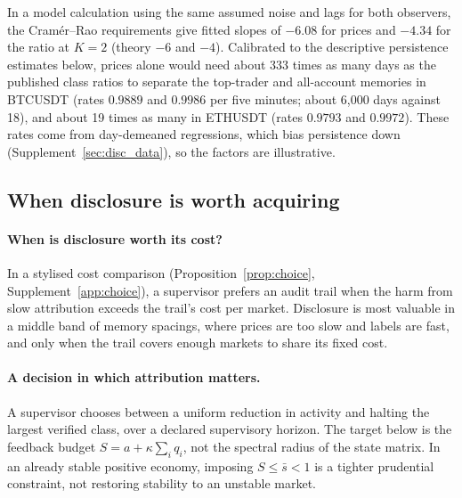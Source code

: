 \documentclass[12pt]{article}
\theoremstyle{definition}
\theoremstyle{remark}
\begin{document}
In a model calculation using the same assumed noise and lags for both observers, the Cram\'er--Rao requirements give fitted slopes of $-6.08$ for prices and $-4.34$ for the ratio at $K=2$ (theory $-6$ and $-4$). Calibrated to the descriptive persistence estimates below, prices alone would need about 333 times as many days as the published class ratios to separate the top-trader and all-account memories in BTCUSDT (rates $0.9889$ and $0.9986$ per five minutes; about 6{,}000 days against 18), and about 19 times as many in ETHUSDT (rates $0.9793$ and $0.9972$). These rates come from day-demeaned regressions, which bias persistence down (Supplement~\ref{sec:disc_data}), so the factors are illustrative.

\subsection{When disclosure is worth acquiring}\label{sec:decision}

\paragraph{When is disclosure worth its cost?} In a stylised cost comparison (Proposition~\ref{prop:choice}, Supplement~\ref{app:choice}), a supervisor prefers an audit trail when the harm from slow attribution exceeds the trail's cost per market. Disclosure is most valuable in a middle band of memory spacings, where prices are too slow and labels are fast, and only when the trail covers enough markets to share its fixed cost.

\paragraph{A decision in which attribution matters.} A supervisor chooses between a uniform reduction in activity and halting the largest verified class, over a declared supervisory horizon. The target below is the feedback budget $S=a+\kappa\sum_i q_i$, not the spectral radius of the state matrix. In an already stable positive economy, imposing $S\le\bar s<1$ is a tighter prudential constraint, not restoring stability to an unstable market.
\end{document}

